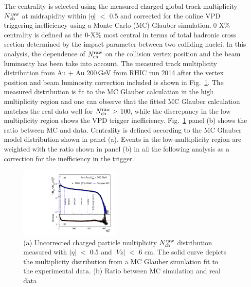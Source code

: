 \documentclass[%
 reprint,	
 amsmath,amssymb,
 aps,
 prc,
]{revtex4-1}
\begin{document}
The centrality is selected using the measured charged global track multiplicity $N_{\rm ch}^{\rm raw}$ at midrapidity within $|\eta|$ $<$ 0.5 and corrected for the online VPD triggering inefficiency using a Monte Carlo (MC) Glauber simulation. 0-X\% centrality is defined as the 0-X\% most central in terms of total hadronic cross section determined by the impact parameter between two colliding nuclei. In this analysis, the dependence of $N_{\rm ch}^{\rm raw}$ on the collision vertex position and the beam luminosity has been take into account. The measured track multiplicity distribution from Au + Au 200\,GeV from RHIC run 2014 after the vertex position and beam luminosity correction included is shown in Fig.~\ref{fig:centrality}. The measured distribution is fit to the MC Glauber calculation in the high multiplicity region and one can observe that the fitted MC Glauber calculation matches the real data well for $N_{\rm ch}^{\rm raw} >$ 100, while the discrepancy in the low multiplicity region shows the VPD trigger inefficiency. Fig.~\ref{fig:centrality} panel (b) shows the ratio between MC and data. Centrality is defined according to the MC Glauber model distribution shown in panel (a). Events in the low-multiplicity region are weighted with the ratio shown in panel (b) in all the following analysis as a correction for the inefficiency in the trigger.

\begin{figure}[h]
\centering
\includegraphics[width=0.45\textwidth]{fig/centrality.pdf}
\caption{(a) Uncorrected charged particle multiplicity $N_{\rm ch}^{\rm raw}$ distribution measured with $|\eta|$ $<$ 0.5 and $|Vz|$ $<$ 6 cm. The solid curve depicts the multiplicity distribution from a MC Glauber simulation fit to the experimental data. (b) Ratio between MC simulation and real data}
\label{fig:centrality} 
\end{figure}
\end{document}
